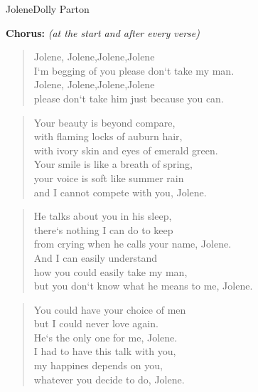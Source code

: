 \begin{song}{Jolene}{Dolly Parton}
		
		
		\textbf{Chorus:} \emph{(at the start and after every verse)}\\
		
		\begin{verse}
			Jolene, \quad Jolene,\quad Jolene,\quad Jolene \quad{} \\
			I`m begging of you please don`t take my man. \quad{} \\
			Jolene, \quad Jolene,\quad Jolene,\quad Jolene \quad{}\\
			please don`t take him just because you can. \quad{}\\
		\end{verse}
		
		\begin{verse}
			Your beauty is beyond compare, \\
			with flaming locks of auburn hair, \\
			with ivory skin and eyes of emerald green. \\
			Your smile is like a breath of spring, \\
			your voice is soft like summer rain \\
			and I cannot compete with you, Jolene. \\
		\end{verse}
		
		\begin{verse}
			He talks about you in his sleep, \\
			there`s nothing I can do to keep \\
			from crying when he calls your name, Jolene.  \\
			And I can easily understand \\
			how you could easily take my man, \\
			but you don`t know what he means to me, Jolene. \\
		\end{verse}
		
		\begin{verse}
			You could have your choice of men \\
			but I could never love again. \\
			He`s the only one for me, Jolene. \\
			I had to have this talk with you, \\ 
			my happines depends on you, \\
			whatever you decide to do, Jolene.
		\end{verse}
		
	\end{song}